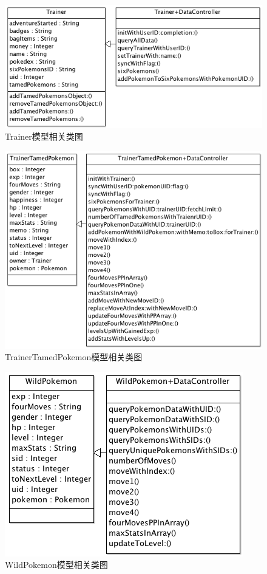 \documentclass{article}
\begin{document}
\begin{CJK}{UTF8}{gbsn}
  \begin{figure}[htbp]
		\centering
		\includegraphics[bb=0 0 570 273, scale=0.45]{figure/fig_n12.png}
		\caption{Trainer模型相关类图}
		\label{fig:n12}
	\end{figure}

  \begin{figure}[htbp]
		\centering
		\includegraphics[bb=0 0 576 440, scale=0.45]{figure/fig_n13.png}
		\caption{TrainerTamedPokemon模型相关类图}
		\label{fig:n13}
	\end{figure}

  \begin{figure}[htbp]
		\centering
		\includegraphics[bb=0 0 391 304, scale=0.45]{figure/fig_n14.png}
		\caption{WildPokemon模型相关类图}
		\label{fig:n14}
	\end{figure}


\end{CJK}
\end{document}
